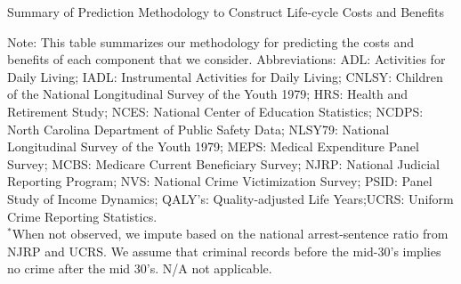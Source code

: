 \begin{table}
\begin{threeparttable}
\caption{Summary of Prediction Methodology to Construct Life-cycle Costs and Benefits} \label{table:sources}
\tiny

\begin{tablenotes}
\scriptsize
Note: This table summarizes our methodology for predicting the costs and benefits of each component that we consider. Abbreviations: ADL: Activities for Daily Living; IADL: Instrumental Activities for Daily Living; CNLSY: Children of the National Longitudinal Survey of the Youth 1979;  HRS: Health and Retirement Study; NCES: National Center of Education Statistics; NCDPS: North Carolina Department of Public Safety Data; NLSY79: National Longitudinal Survey of the Youth 1979; MEPS: Medical Expenditure Panel Survey; MCBS: Medicare Current Beneficiary Survey; NJRP: National Judicial Reporting Program; NVS: National Crime Victimization Survey; PSID: Panel Study of Income Dynamics; QALY's: Quality-adjusted Life Years;UCRS: Uniform Crime Reporting Statistics.\\
$^*$When not observed, we impute based on the national arrest-sentence ratio  from NJRP and UCRS. We assume that criminal records before the mid-30's implies no crime after the mid 30's. N/A not applicable.
\end{tablenotes}
\end{threeparttable}
\end{table}

